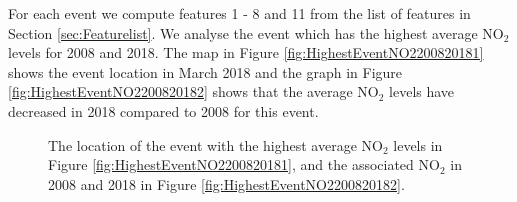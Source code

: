 \documentclass[11pt]{article}
\begin{document}
	For each event we compute features 1 - 8 and 11 from the list of features in  Section \ref{sec:Featurelist}. We analyse the event which has the highest average $\text{NO}_2$ levels for 2008 and 2018. The map in Figure \ref{fig:HighestEventNO2200820181} shows the event location in March 2018 and the graph in  Figure \ref{fig:HighestEventNO2200820182} shows that the average  $\text{NO}_2$ levels have decreased in 2018 compared to 2008 for this event.


	\begin{figure}[H]
	\centering
	\caption{\footnotesize The location of the event with the highest average $\text{NO}_2$ levels in Figure \ref{fig:HighestEventNO2200820181}, and the associated $\text{NO}_2$ in 2008 and 2018 in Figure \ref{fig:HighestEventNO2200820182}. }
	\label{fig:HighestEventNO220082018}
	\end{figure}
	
\end{document}
